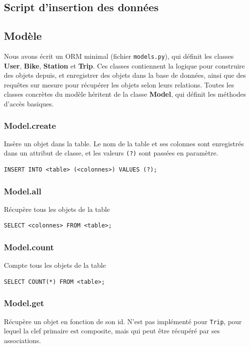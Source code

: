 \documentclass[a4paper,10pt]{article}
\begin{document}
\subsection{Script d'insertion des données}


\subsection{Modèle}
Nous avons écrit un ORM minimal (fichier \texttt{models.py}), qui définit les classes
\textbf{User}, \textbf{Bike}, \textbf{Station} et \textbf{Trip}. Ces classes contiennent
la logique pour construire des objets depuis, et enregistrer des objets dans la base
de données, ainsi que des requêtes sur mesure pour récupérer les objets selon leurs
relations. Toutes les classes concrètes du modèle héritent de la classe \textbf{Model}, qui
définit les méthodes d'accès basiques.

\subsubsection{Model.create}
Insère un objet dans la table. Le nom de la table et ses colonnes sont enregistrés
dans un attribut de classe, et les valeurs \texttt{(?)} sont passées en paramètre.

\begin{lstlisting}
INSERT INTO <table> (<colonnes>) VALUES (?);
\end{lstlisting}

\subsubsection{Model.all}
Récupère tous les objets de la table

\begin{lstlisting}
SELECT <colonnes> FROM <table>;
\end{lstlisting}

\subsubsection{Model.count}
Compte tous les objets de la table

\begin{lstlisting}
SELECT COUNT(*) FROM <table>;
\end{lstlisting}

\subsubsection{Model.get}
Récupère un objet en fonction de son id. N'est pas implémenté pour \texttt{Trip},
pour lequel la clef primaire est composite, mais qui peut être récupéré par ses
associations.
\end{document}
